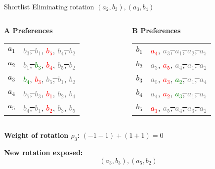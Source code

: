 \documentclass[aspectratio=169,xcolor=dvipsnames]{beamer}
\begin{document}
\begin{frame}{Shortlist}
Eliminating rotation \( (a_2, b_3), (a_3, b_4) \)

\vspace{1em}
\begin{columns}[t]
  \begin{column}{0.45\textwidth}
    \textbf{A Preferences}\\[6pt]
    \begin{tabular}{r@{: }l}
      $a_1$ & \sout{\textcolor{gray}{$b_3$}, \textcolor{gray}{$b_1$}}, \textcolor{red}{$b_5$}, \sout{\textcolor{gray}{$b_4$}, \textcolor{gray}{$b_2$}} \\
      $a_2$ & \sout{\textcolor{gray}{$b_1$}, \textcolor{green}{$b_3$}}, \textcolor{red}{$b_4$}, \sout{\textcolor{gray}{$b_5$}, \textcolor{gray}{$b_2$}} \\
      $a_3$ & \sout{\textcolor{green}{$b_4$}}, \textcolor{red}{$b_3$}, \sout{\textcolor{gray}{$b_5$}, \textcolor{gray}{$b_1$}}, \textcolor{gray}{$b_2$} \\
      $a_4$ & \sout{\textcolor{gray}{$b_5$}, \textcolor{gray}{$b_3$}}, \textcolor{red}{$b_1$}, \sout{\textcolor{gray}{$b_2$}}, \textcolor{gray}{$b_4$} \\
      $a_5$ & \sout{\textcolor{gray}{$b_4$}, \textcolor{gray}{$b_1$}}, \textcolor{red}{$b_2$}, \textcolor{gray}{$b_3$}, \sout{\textcolor{gray}{$b_5$}} \\
    \end{tabular}
  \end{column}

  \begin{column}{0.45\textwidth}
    \textbf{B Preferences}\\[6pt]
    \begin{tabular}{r@{: }l}
      $b_1$ & \textcolor{red}{$a_4$}, \sout{\textcolor{gray}{$a_3$}, \textcolor{gray}{$a_1$}, \textcolor{gray}{$a_2$}, \textcolor{gray}{$a_5$}} \\
      $b_2$ & \textcolor{gray}{$a_3$}, \textcolor{red}{$a_5$}, \sout{\textcolor{gray}{$a_4$}, \textcolor{gray}{$a_1$}, \textcolor{gray}{$a_2$}} \\
      $b_3$ & \textcolor{gray}{$a_5$}, \textcolor{red}{$a_3$}, \sout{\textcolor{green}{$a_2$}, \textcolor{gray}{$a_1$}, \textcolor{gray}{$a_4$}} \\
      $b_4$ & \textcolor{gray}{$a_4$}, \textcolor{red}{$a_2$}, \sout{\textcolor{green}{$a_3$}, \textcolor{gray}{$a_1$}, \textcolor{gray}{$a_5$}} \\
      $b_5$ & \textcolor{red}{$a_1$}, \sout{\textcolor{gray}{$a_5$}, \textcolor{gray}{$a_4$}, \textcolor{gray}{$a_3$}, \textcolor{gray}{$a_2$}} \\
    \end{tabular}
  \end{column}
\end{columns}

\vspace{1em}
\pause
\textbf{Weight of rotation \( \rho_3 \):} \( (-1-1) + (1+1) = 0 \)

\pause
\textbf{New rotation exposed:} 
\[
(a_3,b_3), (a_5,b_2)
\]
\end{frame}
\end{document}
